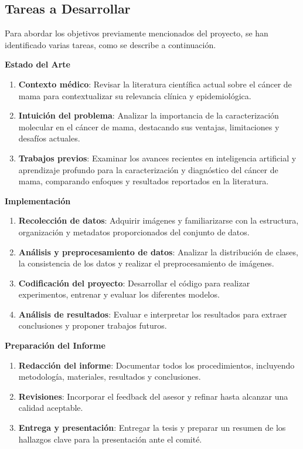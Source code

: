 \documentclass[a4paper,10pt]{book}
\begin{document}
\subsection{Tareas a Desarrollar}

Para abordar los objetivos previamente mencionados del proyecto, se han identificado varias tareas, como se describe a continuación.

\textbf{Estado del Arte}

\begin{enumerate}
\item \textbf{Contexto médico}: Revisar la literatura científica actual sobre el cáncer de mama para contextualizar su relevancia clínica y epidemiológica.
\item \textbf{Intuición del problema}: Analizar la importancia de la caracterización molecular en el cáncer de mama, destacando sus ventajas, limitaciones y desafíos actuales.
\item \textbf{Trabajos previos}: Examinar los avances recientes en inteligencia artificial y aprendizaje profundo para la caracterización y diagnóstico del cáncer de mama, comparando enfoques y resultados reportados en la literatura.
\end{enumerate}

\textbf{Implementación}

\begin{enumerate}
\item \textbf{Recolección de datos}: Adquirir imágenes y familiarizarse con la estructura, organización y metadatos proporcionados del conjunto de datos.
\item \textbf{Análisis y preprocesamiento de datos}: Analizar la distribución de clases, la consistencia de los datos y realizar el preprocesamiento de imágenes.
\item \textbf{Codificación del proyecto}: Desarrollar el código para realizar experimentos, entrenar y evaluar los diferentes modelos.
\item \textbf{Análisis de resultados}: Evaluar e interpretar los resultados para extraer conclusiones y proponer trabajos futuros.
\end{enumerate}

\textbf{Preparación del Informe}

\begin{enumerate}
\item \textbf{Redacción del informe}: Documentar todos los procedimientos, incluyendo metodología, materiales, resultados y conclusiones.
\item \textbf{Revisiones}: Incorporar el feedback del asesor y refinar hasta alcanzar una calidad aceptable.
\item \textbf{Entrega y presentación}: Entregar la tesis y preparar un resumen de los hallazgos clave para la presentación ante el comité.
\end{enumerate}
\end{document}
